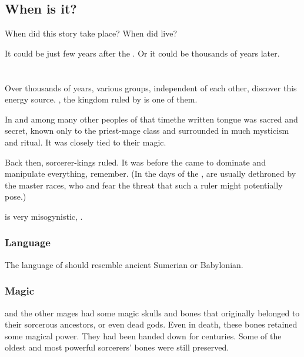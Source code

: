 \subsection{When is it?}
When did this story take place? 
When did \Thanatzil{} live? 

It could be just few years after the .
Or it could be thousands of years later. 















\section{\Girigor}
Over thousands of years, various groups, independent of each other, discover this energy source. \Girigor, the \nephilic{} kingdom ruled by  is one of them. 

In \Girigor\dash and among many other \nephilic{} peoples of that time\dash the written tongue was sacred and secret, known only to the priest-mage class and surrounded in much mysticism and ritual. It was closely tied to their magic. 

Back then, sorcerer-kings ruled. It was before the \feud{} came to dominate and manipulate everything, remember. (In the days of the \charade,  are usually dethroned by the master races, who  and fear the threat that such a ruler might potentially pose.)

\Girigor{} is very misogynistic, . 





\subsubsection{Language}
The language of \Girigor{} should resemble ancient Sumerian or Babylonian. 





\subsubsection{Magic}
\Semiza{} and the other mages had some magic skulls and bones that originally belonged to their sorcerous ancestors, or even dead gods. 
Even in death, these bones retained some magical power. 
They had been handed down for centuries. 
Some of the oldest and most powerful sorcerers' bones were still preserved. 

